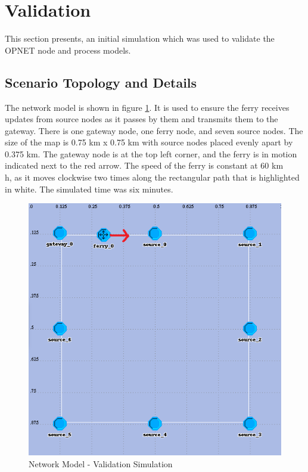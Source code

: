 \section{Validation} 
\label{sec:validation}

This section presents, an initial simulation which was used to validate the OPNET node and process models. 


\subsection{Scenario Topology and Details}
\label{sec:scenario1}

The network model is shown in figure \ref{fig:scenario1}.
It is used to ensure the ferry receives updates from source nodes as it passes by them and transmits them to the gateway. 
There is one gateway node, one ferry node, and seven source nodes. 
The size of the map is 0.75 km x 0.75 km with source nodes placed evenly apart by 0.375 km. 
The gateway node is at the top left corner, and the ferry is in motion indicated next to the red arrow.
The speed of the ferry is constant at 60 km\\h, as it moves clockwise two times along the rectangular path that is highlighted in white.  
The simulated time was six minutes.

\begin{figure}[ht]
    \centering
    \includegraphics[width=.7\textwidth]{images/scenario1-top1r}
    \caption{Network Model - Validation Simulation}
    \label{fig:scenario1}
\end{figure}

